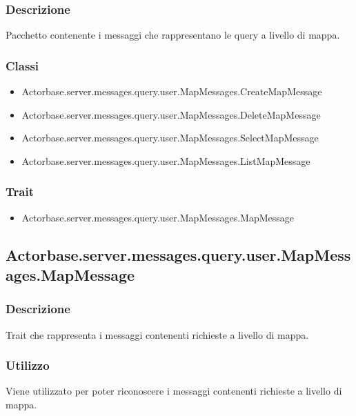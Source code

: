 \documentclass[a4paper]{article}
\begin{document}
			\subsubsection{Descrizione}
				Pacchetto contenente i messaggi che rappresentano le query a livello di mappa.				
				
			\subsubsection{Classi}
				\begin{itemize}
					\item Actorbase.server.messages.query.user.MapMessages.CreateMapMessage
					\item Actorbase.server.messages.query.user.MapMessages.DeleteMapMessage
					\item Actorbase.server.messages.query.user.MapMessages.SelectMapMessage
					\item Actorbase.server.messages.query.user.MapMessages.ListMapMessage
				\end{itemize}
				
			\subsubsection{Trait}
				\begin{itemize}
					\item Actorbase.server.messages.query.user.MapMessages.MapMessage
				\end{itemize}
		
		\subsection{Actorbase.server.messages.query.user.MapMessages.MapMessage}
			\subsubsection{Descrizione}
				Trait che rappresenta i messaggi contenenti richieste a livello di mappa.
				
			\subsubsection{Utilizzo}
				Viene utilizzato per poter riconoscere i messaggi contenenti richieste a livello di mappa.
				
\end{document}
